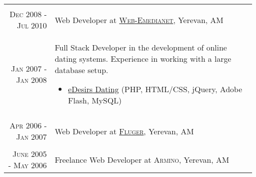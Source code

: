 \documentclass[a4paper,10pt]{article}
\begin{document}
\begin{tabular}{r|p{11cm}}
\multicolumn{2}{c}{} \\


\textsc{Dec 2008 - Jul 2010}
    & Web Developer at
      \textsc{\href{http://web-emedianet.com/}{Web-Emedianet}}, Yerevan, AM \\
  \textsc{Jan 2007 - Jan 2008}
    & \footnotesize{ Full Stack Developer in the development of online dating
      systems. Experience in working with a large database setup.
  \begin{itemize}
    \item \href{http://www.edesirs.com/}{eDesirs Dating}
    (PHP, HTML/CSS, jQuery, Adobe Flash, MySQL)
  \end{itemize}
} \\


\multicolumn{2}{c}{} \\


\textsc{Apr 2006 - Jan 2007}
  & Web Developer at \textsc{\href{http://www.fluger.com}{Fluger}},
    Yerevan, AM \\


\multicolumn{2}{c}{} \\


\textsc{June 2005 - May 2006}
  & Freelance Web Developer at \textsc{Armino}, Yerevan, AM \\

\end{tabular}


\end{document}
